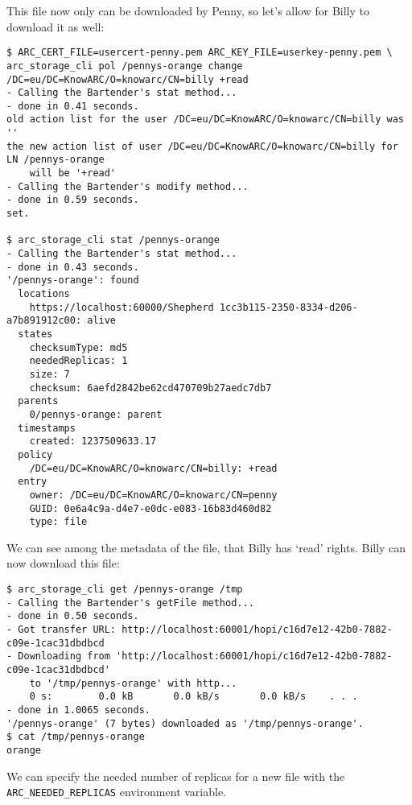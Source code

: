 \documentclass{book}
\begin{document}
This file now only can be downloaded by Penny, so let's allow for Billy to download it as well:

\begin{verbatim}
$ ARC_CERT_FILE=usercert-penny.pem ARC_KEY_FILE=userkey-penny.pem \
arc_storage_cli pol /pennys-orange change /DC=eu/DC=KnowARC/O=knowarc/CN=billy +read
- Calling the Bartender's stat method...
- done in 0.41 seconds.
old action list for the user /DC=eu/DC=KnowARC/O=knowarc/CN=billy was ''
the new action list of user /DC=eu/DC=KnowARC/O=knowarc/CN=billy for LN /pennys-orange
    will be '+read'
- Calling the Bartender's modify method...
- done in 0.59 seconds.
set.

$ arc_storage_cli stat /pennys-orange
- Calling the Bartender's stat method...
- done in 0.43 seconds.
'/pennys-orange': found
  locations
    https://localhost:60000/Shepherd 1cc3b115-2350-8334-d206-a7b891912c00: alive
  states
    checksumType: md5
    neededReplicas: 1
    size: 7
    checksum: 6aefd2842be62cd470709b27aedc7db7
  parents
    0/pennys-orange: parent
  timestamps
    created: 1237509633.17
  policy
    /DC=eu/DC=KnowARC/O=knowarc/CN=billy: +read
  entry
    owner: /DC=eu/DC=KnowARC/O=knowarc/CN=penny
    GUID: 0e6a4c9a-d4e7-e0dc-e083-16b83d460d82
    type: file
\end{verbatim}

We can see among the metadata of the file, that Billy has `read' rights. Billy can now download this file:

\begin{verbatim}
$ arc_storage_cli get /pennys-orange /tmp
- Calling the Bartender's getFile method...
- done in 0.50 seconds.
- Got transfer URL: http://localhost:60001/hopi/c16d7e12-42b0-7882-c09e-1cac31dbdbcd
- Downloading from 'http://localhost:60001/hopi/c16d7e12-42b0-7882-c09e-1cac31dbdbcd'
    to '/tmp/pennys-orange' with http...
    0 s:        0.0 kB       0.0 kB/s       0.0 kB/s    . . .       
- done in 1.0065 seconds.
'/pennys-orange' (7 bytes) downloaded as '/tmp/pennys-orange'.
$ cat /tmp/pennys-orange 
orange
\end{verbatim}

We can specify the needed number of replicas for a new file with the \verb!ARC_NEEDED_REPLICAS! environment variable.
\end{document}
